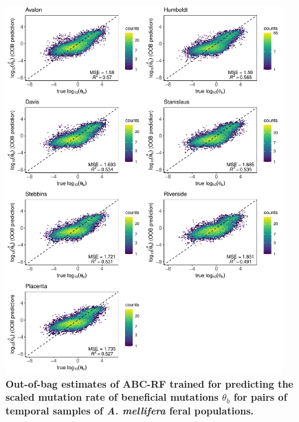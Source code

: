 \documentclass[a4paper, 12pt]{article}
\begin{document}
\begin{figure}[ht]
  \centering
  \includegraphics[width=0.95\textwidth]{Figures/FigureS17_combined_plot_thetab.pdf}
  \small\caption{\textbf{Out-of-bag estimates of ABC-RF trained for predicting the scaled mutation rate of beneficial mutations $\theta_{b}$ for pairs of temporal samples of \textit{A. mellifera} feral populations.}}
  \label{fig:supple_feralbee_thetab}
\end{figure}
\end{document}
